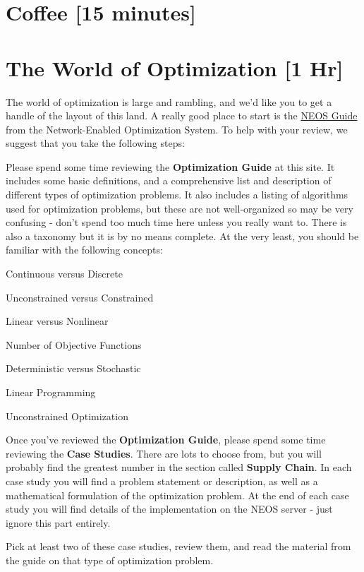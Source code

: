 \documentclass{tufte-handout}
\begin{document}
\section{Coffee [15 minutes]}

\clearpage

\section{The World of Optimization [1 Hr]}

The world of optimization is large and rambling, and we'd like you to get a handle of the layout of this land. A really good place to start is the \href{https://neos-guide.org}{NEOS Guide} from the Network-Enabled Optimization System. To help with your review, we suggest that you take the following steps:

\be[resume]
\item Please spend some time reviewing the {\bf Optimization Guide} at this site. It includes some basic definitions, and a comprehensive list and description of different types of optimization problems. It also includes a listing of algorithms used for optimization problems, but these are not well-organized so may be very confusing - don't spend too much time here unless you really want to. There is also a taxonomy but it is by no means complete. At the very least, you should be familiar with the following concepts:
\be
\item Continuous versus Discrete
\item Unconstrained versus Constrained
\item Linear versus Nonlinear
\item Number of Objective Functions
\item Deterministic versus Stochastic
\item Linear Programming
\item Unconstrained Optimization
\ee

\item Once you've reviewed the {\bf Optimization Guide}, please spend some time reviewing the {\bf Case Studies}. There are lots to choose from, but you will probably find the greatest number in the section called {\bf Supply Chain}. In each case study you will find a problem statement or description, as well as a mathematical formulation of the optimization problem. At the end of each case study you will find details of the implementation on the NEOS server - just ignore this part entirely.
\be
\item Pick at least two of these case studies, review them, and read the material from the guide on that type of optimization problem.
\ee
\ee
\end{document}
